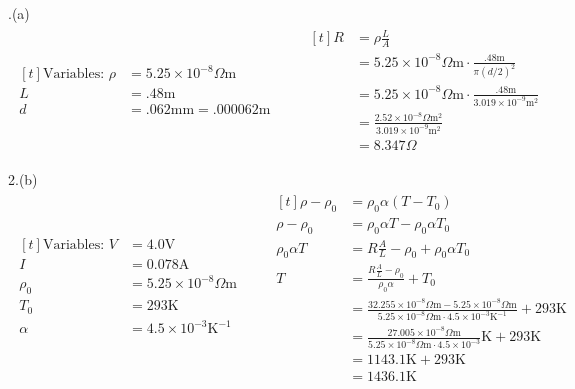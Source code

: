 \documentclass[11pt]{article}
\begin{document}
.(a)
\begin{align*}
\begin{aligned}[t]
\text{Variables: }
\rho &= 5.25 \times 10^{-8} \Omega \mathrm{m}\\
L &= .48 \mathrm{m} \\
d &= .062 \mathrm{mm} = .000062 \mathrm{m}
\end{aligned}
\qquad
\begin{aligned}[t]
R &= \rho \frac{L}{A} \\
  &= 5.25 \times 10^{-8} \Omega \mathrm{m} \cdot \frac{.48 \mathrm{m}}{\pi (d/2)^2} \\
  &= 5.25 \times 10^{-8} \Omega \mathrm{m} \cdot \frac{.48 \mathrm{m}}{3.019 \times 10^{-9} \mathrm{m}^2} \\
  &= \frac{2.52 \times 10^{-8} \Omega \mathrm{m}^2}{3.019 \times 10^{-9} \mathrm{m}^2} \\
  &= 8.347 \Omega
\end{aligned}
\end{align*}

2.(b)
\begin{align*}
\begin{aligned}[t]
\text{Variables: }
V &= 4.0 \mathrm{V} \\
I &= 0.078 \mathrm{A} \\
\rho_0 &= 5.25 \times 10^{-8} \Omega \mathrm{m} \\
T_0 &= 293 \mathrm{K} \\
\alpha &= 4.5 \times 10^{-3} \mathrm{K}^{-1} \\
\end{aligned}
\qquad
\begin{aligned}[t]
\rho - \rho_0 &= \rho_0 \alpha (T - T_0) \\
\rho - \rho_0 &= \rho_0 \alpha T - \rho_0 \alpha T_0 \\
\rho_0 \alpha T &= R \frac{A}{L} - \rho_0 + \rho_0 \alpha T_0 \\
T &= \frac{R \frac{A}{L} - \rho_0 }{\rho_0 \alpha} + T_0 \\
  &= \frac{32.255 \times 10^{-8} \Omega \mathrm{m} - 5.25 \times 10^{-8} \Omega \mathrm{m}}{5.25 \times 10^{-8} \Omega \mathrm{m} \cdot 4.5 \times 10^{-3} \mathrm{K}^{-1}} + 293 \mathrm{K} \\
  &= \frac{27.005 \times 10^{-8} \Omega \mathrm{m}}{5.25 \times 10^{-8} \Omega \mathrm{m} \cdot 4.5 \times 10^{-3}} \mathrm{K} + 293 \mathrm{K} \\
  &= 1143.1 \mathrm{K} + 293 \mathrm{K} \\
  &= 1436.1 \mathrm{K}
\end{aligned}
\end{align*}
\end{document}
